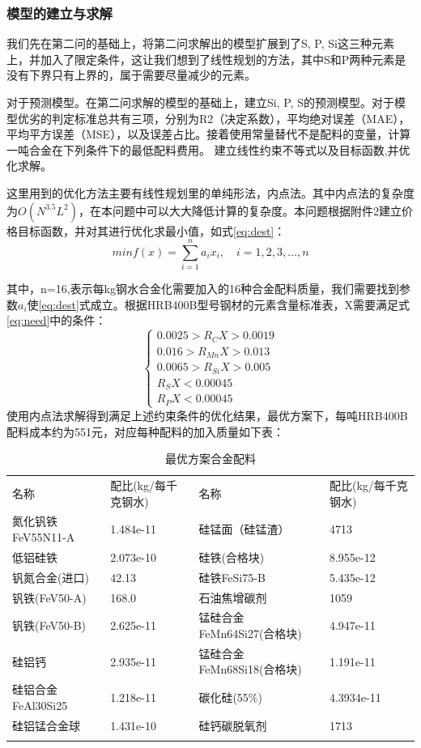 \documentclass{xcumcmart}
\begin{document}
\subsubsection{模型的建立与求解}
\par 我们先在第二问的基础上，将第二问求解出的模型扩展到了S, P, Si这三种元素上，并加入了限定条件，这让我们想到了线性规划的方法，其中S和P两种元素是没有下界只有上界的，属于需要尽量减少的元素。
\par 对于预测模型。在第二问求解的模型的基础上，建立Si, P, S的预测模型。对于模型优劣的判定标准总共有三项，分别为R2（决定系数），平均绝对误差（MAE），平均平方误差（MSE），以及误差占比。接着使用常量替代不是配料的变量，计算一吨合金在下列条件下的最低配料费用。
建立线性约束不等式以及目标函数,并优化求解。
\par 这里用到的优化方法主要有线性规划里的单纯形法，内点法。其中内点法的复杂度为$O(N^{3.5}L^2)$，在本问题中可以大大降低计算的复杂度。本问题根据附件2建立价格目标函数，并对其进行优化求最小值，如式\ref{eq:dest}：
\begin{equation}\label{eq:dest}
	min f(x) = \sum_{i=1}^na_ix_i, \quad i=1,2,3,\ldots ,n
\end{equation}

其中，n=16,表示每kg钢水合金化需要加入的16种合金配料质量，我们需要找到参数$a_i$使\ref{eq:dest}式成立。根据HRB400B型号钢材的元素含量标准表，X需要满足式\ref{eq:need}中的条件：
\begin{equation}\label{eq:need}
	\left\{\begin{array}{l}
		0.0025>R_CX>0.0019  \\
		0.016>R_{Mn}X>0.013 \\
		0.0065>R_{Si}X>0.005 \\
		R_SX<0.00045 \\
		R_PX<0.00045 
	\end{array}\right.
\end{equation}
使用内点法求解得到满足上述约束条件的优化结果，最优方案下，每吨HRB400B配料成本约为551元，对应每种配料的加入质量如下表：
\begin{table}[htbp]
	\centering
	\begin{tabu}{l l|l l}
		\tabucline[1.5pt]{-}
		名称 & 配比(kg/每千克钢水) & 名称 & 配比(kg/每千克钢水)\\
		\tabucline[1.5pt]{-}
		氮化钒铁FeV55N11-A & 1.484e-11 & 硅锰面（硅锰渣） & 4713 \\
		低铝硅铁 & 2.073e-10 & 硅铁(合格块) & 8.955e-12 \\
		钒氮合金(进口) & 42.13 & 硅铁FeSi75-B & 5.435e-12 \\
		钒铁(FeV50-A) & 168.0 & 石油焦增碳剂 & 1059 \\
		钒铁(FeV50-B) & 2.625e-11 & 锰硅合金FeMn64Si27(合格块) & 4.947e-11 \\
		硅铝钙 & 2.935e-11 & 锰硅合金FeMn68Si18(合格块) & 1.191e-11 \\
		硅铝合金FeAl30Si25 & 1.218e-11 & 碳化硅(55\%) & 4.3934e-11 \\
		硅铝锰合金球 & 1.431e-10 & 硅钙碳脱氧剂 & 1713\\
		\tabucline[1.5pt]{-}
	\end{tabu}
	\caption{最优方案合金配料\label{tb:best}}
\end{table}
\end{document}
